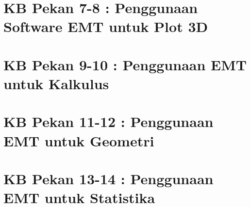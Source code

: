 \documentclass{report}
\begin{document}
\newpage
\chapter{KB Pekan 7-8 : Penggunaan Software EMT untuk Plot 3D}


\newpage
\chapter{KB Pekan 9-10 : Penggunaan EMT untuk Kalkulus}


\newpage
\chapter{KB Pekan 11-12 : Penggunaan EMT untuk Geometri}


\newpage
\chapter{KB Pekan 13-14 : Penggunaan EMT untuk Statistika}

\end{document}
